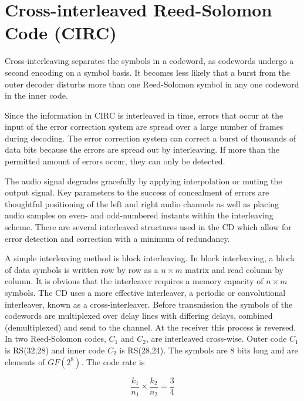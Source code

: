 \documentclass[../main.tex]{subfiles}
\begin{document}
    \newpage


    \section{Cross-interleaved Reed-Solomon Code (CIRC)}

    Cross-interleaving separates the symbols in a codeword, as codewords undergo a second encoding on a symbol basis. It becomes less likely that a burst from the outer decoder disturbs more than one Reed-Solomon symbol in any one codeword in the inner code.

    Since the information in CIRC is interleaved in time, errors that occur at the input of the error correction system are spread over a large number of frames during decoding. The error correction system can correct a burst of thousands of data bits because the errors are spread out by interleaving. If more than the permitted amount of errors occur, they can only be detected.

    The audio signal degrades gracefully by applying interpolation or muting the output signal. Key parameters to the success of concealment of errors are thoughtful positioning of the left and right audio channels as well as placing audio samples on even- and odd-numbered instants within the interleaving scheme. There are several interleaved structures used in the CD which allow for error detection and correction with a minimum of redundancy.

    A simple interleaving method is block interleaving. In block interleaving, a block of data symbols is written row by row as a $n \times m$ matrix and read column by column. It is obvious that the interleaver requires a memory capacity of $n \times m$ symbols. The CD uses a more effective interleaver, a periodic or convolutional interleaver, known as a cross-interleaver. Before transmission the symbols of the codewords are multiplexed over delay lines with differing delays, combined (demultiplexed) and send to the channel. At the receiver this process is reversed. In  two Reed-Solomon codes, $C_1$ and $C_2$, are interleaved cross-wise. Outer code $C_1$ is RS(32,28) and inner code $C_2$ is RS(28,24). The symbols are 8 bits long and are elements of $GF(2^8)$. The code rate is

    \begin{equation*}
        \frac{k_1}{n_1} \times \frac{k_2}{n_2} = \frac{3}{4}
    \end{equation*}
\end{document}
